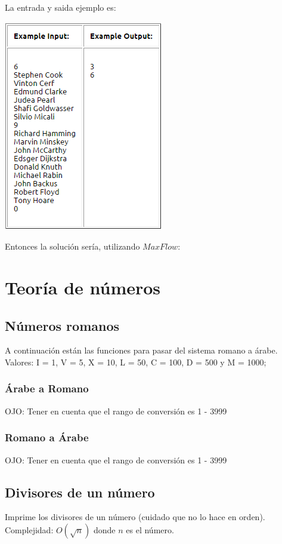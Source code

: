 \documentclass[10pt,letterpaper,twocolumn]{article}
\newcommand{\source}[1]{
  
  \dotfill
}
\begin{document}
\newline
La entrada y saida ejemplo es:\\
  \begin{center}
  \includegraphics{./src/konigSample.png}
  \end{center}
Entonces la solución sería, utilizando $MaxFlow$:\\
  \source{src/konigSampleCode.cpp}
\section{Teoría de números}
  \subsection{Números romanos}
    A continuación están las funciones para pasar del sistema romano a árabe.\\
    Valores: I = 1, V = 5, X = 10, L = 50, C = 100, D = 500 y M = 1000;
    \subsubsection{Árabe a Romano}
      OJO: Tener en cuenta que el rango de conversión es 1 - 3999
      \source{src/arabicToRoman.cpp}
    \subsubsection{Romano a Árabe}
      OJO: Tener en cuenta que el rango de conversión es 1 - 3999
      \source{src/romanToArabic.cpp}
    \subsection{Divisores de un número}
      Imprime los divisores de un número (cuidado que no lo hace en orden).\\
      Complejidad: $O(\sqrt{n})$ donde $n$ es el número.\\
      \source{./src/divisors.cpp}
\end{document}
